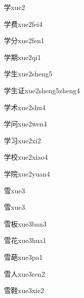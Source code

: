\begin{verbete}[8]{学}{xue2}
\end{verbete}
\begin{verbete}[8;9]{学费}{xue2fei4}
\end{verbete}
\begin{verbete}[8;4]{学分}{xue2fen1}
\end{verbete}
\begin{verbete}[8;12]{学期}{xue2qi1}
\end{verbete}
\begin{verbete}[8;5]{学生}{xue2sheng5}
\end{verbete}
\begin{verbete}[8;5;7]{学生证}{xue2sheng5zheng4}
\end{verbete}
\begin{verbete}[8;5]{学术}{xue2shu4}
\end{verbete}
\begin{verbete}[8;6]{学问}{xue2wen4}
\end{verbete}
\begin{verbete}[8;3]{学习}{xue2xi2}
\end{verbete}
\begin{verbete}[8;10]{学校}{xue2xiao4}
\end{verbete}
\begin{verbete}[8;9]{学院}{xue2yuan4}
\end{verbete}
\begin{verbete}[11]{雪}{xue3}
\end{verbete}
\begin{verbete*}[11]{雪}{xue3}
\end{verbete*}
\begin{verbete}[11;8]{雪板}{xue3ban3}
\end{verbete}
\begin{verbete}[11;7]{雪花}{xue3hua1}
\end{verbete}
\begin{verbete}[11;12]{雪葩}{xue3pa1}
\end{verbete}
\begin{verbete}[11;2]{雪人}{xue3ren2}
\end{verbete}
\begin{verbete}[11;15]{雪鞋}{xue3xie2}
\end{verbete}

